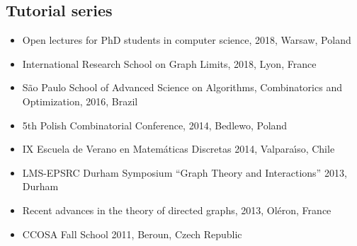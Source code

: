 \documentclass[11pt]{article}
\begin{document}
\subsection*{Tutorial series}
\begin{itemize}
\setlength\itemsep{-1mm}
\item Open lectures for PhD students in computer science, 2018, Warsaw, Poland
\item International Research School on Graph Limits, 2018, Lyon, France
\item S\~ao Paulo School of Advanced Science on Algorithms, Combinatorics and Optimization, 2016, Brazil 
\item 5th Polish Combinatorial Conference, 2014, Bedlewo, Poland
\item IX Escuela de Verano en Matem\'aticas Discretas 2014, Valpara\'\i{}so, Chile
\item LMS-EPSRC Durham Symposium ``Graph Theory and Interactions'' 2013, Durham
\item Recent advances in the theory of directed graphs, 2013, Ol\'eron, France
\item CCOSA Fall School 2011, Beroun, Czech Republic
\end{itemize}

\newpage
\end{document}
